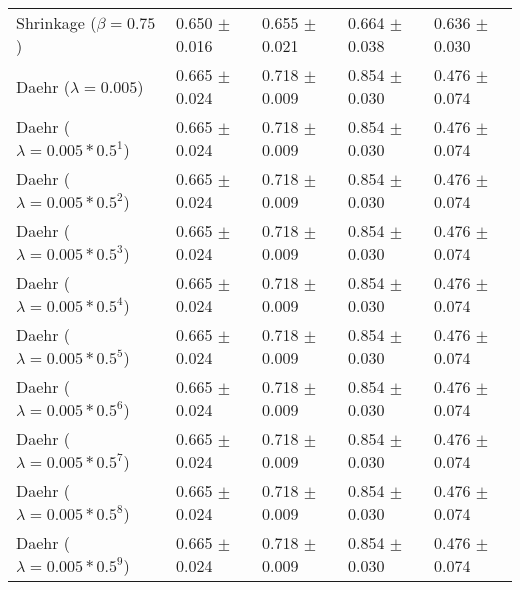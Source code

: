 \begin{table}
\begin{tabular}{*{5}{l}}
Shrinkage ($\beta=0.75$)&0.650 $\pm$ 0.016&0.655 $\pm$ 0.021&0.664 $\pm$ 0.038&0.636 $\pm$ 0.030\\
Daehr ($\lambda=0.005$)&0.665 $\pm$ 0.024&0.718 $\pm$ 0.009&0.854 $\pm$ 0.030&0.476 $\pm$ 0.074\\
Daehr ($\lambda=0.005*0.5^1$)&0.665 $\pm$ 0.024&0.718 $\pm$ 0.009&0.854 $\pm$ 0.030&0.476 $\pm$ 0.074\\
Daehr ($\lambda=0.005*0.5^2$)&0.665 $\pm$ 0.024&0.718 $\pm$ 0.009&0.854 $\pm$ 0.030&0.476 $\pm$ 0.074\\
Daehr ($\lambda=0.005*0.5^3$)&0.665 $\pm$ 0.024&0.718 $\pm$ 0.009&0.854 $\pm$ 0.030&0.476 $\pm$ 0.074\\
Daehr ($\lambda=0.005*0.5^4$)&0.665 $\pm$ 0.024&0.718 $\pm$ 0.009&0.854 $\pm$ 0.030&0.476 $\pm$ 0.074\\
Daehr ($\lambda=0.005*0.5^5$)&0.665 $\pm$ 0.024&0.718 $\pm$ 0.009&0.854 $\pm$ 0.030&0.476 $\pm$ 0.074\\
Daehr ($\lambda=0.005*0.5^6$)&0.665 $\pm$ 0.024&0.718 $\pm$ 0.009&0.854 $\pm$ 0.030&0.476 $\pm$ 0.074\\
Daehr ($\lambda=0.005*0.5^7$)&0.665 $\pm$ 0.024&0.718 $\pm$ 0.009&0.854 $\pm$ 0.030&0.476 $\pm$ 0.074\\
Daehr ($\lambda=0.005*0.5^8$)&0.665 $\pm$ 0.024&0.718 $\pm$ 0.009&0.854 $\pm$ 0.030&0.476 $\pm$ 0.074\\
Daehr ($\lambda=0.005*0.5^9$)&0.665 $\pm$ 0.024&0.718 $\pm$ 0.009&0.854 $\pm$ 0.030&0.476 $\pm$ 0.074\\
\bottomrule
\end{tabular}
\end{table}

